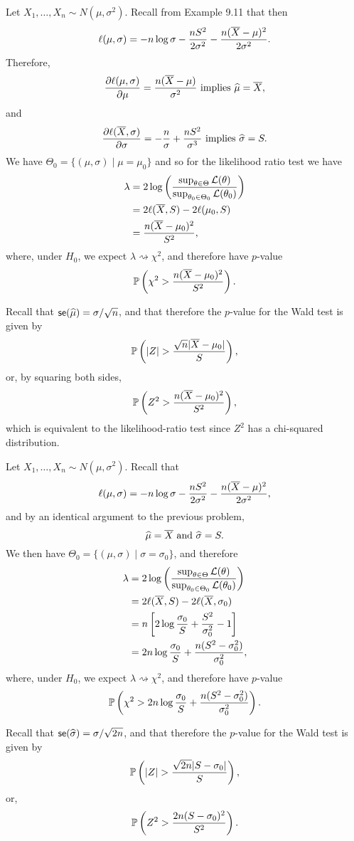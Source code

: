 \begin{ex}
  Let $X_1,\ldots, X_n\sim N(\mu, \sigma^2)$. Recall from Example 9.11 that then
  \[
    \ell(\mu, \sigma)
    =-n\log\sigma -\frac{nS^2}{2\sigma^2}-\frac{n(\Xbar-\mu)^2}{2\sigma^2}.
  \]
  Therefore,
  \[
    \frac{\pd \ell(\mu, \sigma)}{\pd \mu}
    =\frac{n(\Xbar-\mu)}{\sigma^2}
    \text{ implies }
    \muhat = \overline{X},
  \]
  and
  \[
    \frac{\pd \ell(\Xbar, \sigma)}{\pd \sigma}=-\frac{n}{\sigma}+\frac{nS^2}{\sigma^3}
    \text{ implies }
    \sigmahat = S.
  \]
  We have $\Theta_0=\{(\mu, \sigma) \mid \mu=\mu_0\}$ and so for the likelihood
  ratio test we have
  \begin{align*}
    \lambda
     & = 2\log\left(\frac{\sup_{\theta\in\Theta}\L(\theta)}{\sup_{\theta_0\in\Theta_0}\L(\theta_0)} \right) \\
     & =2\ell(\Xbar, S)-2\ell(\mu_0, S)                                                                     \\
     & =\frac{n(\Xbar-\mu_0)^2}{S^2},
  \end{align*}
  where, under $H_0$, we expect $\lambda\rightsquigarrow \chi^2$, and
  therefore have $p$-value
  \[
    \P{\chi^2>\frac{n(\Xbar-\mu_0)^2}{S^2}}.
  \]

  Recall that $\se(\muhat)=\sigma/\sqrt{n}$, and that therefore the $p$-value
  for the Wald test is given by
  \[
    \P{|Z|>\frac{\sqrt{n}|\Xbar -\mu_0|}{S}},
  \]
  or, by squaring both sides,
  \[
    \P{Z^2>\frac{n(\Xbar -\mu_0)^2}{S^2}},
  \]
  which is equivalent to the likelihood-ratio test since $Z^2$ has a chi-squared
  distribution.
\end{ex}

\begin{ex}
  Let $X_1,\ldots, X_n\sim N(\mu, \sigma^2)$. Recall that
  \[
    \ell(\mu, \sigma)=-n\log\sigma -\frac{nS^2}{2\sigma^2}-\frac{n(\Xbar-\mu)^2}{2\sigma^2},
  \]
  and by an identical argument to the previous problem,
  \[
    \muhat=\Xbar\text{ and }\sigmahat=S.
  \]
  We then have $\Theta_0=\{(\mu, \sigma) \mid \sigma=\sigma_0\}$, and therefore
  \begin{align*}
    \lambda
     & =2\log\left(\frac{\sup_{\theta\in\Theta}\L(\theta)}{\sup_{\theta_0\in\Theta_0}\L(\theta_0)} \right) \\
     & =2\ell(\Xbar, S)-2\ell(\Xbar, \sigma_0)                                                             \\
     & = n\left[2\log\frac{\sigma_0}{S}+\frac{S^2}{\sigma_0^2}-1\right]                                    \\
     & = 2n\log\frac{\sigma_0}{S}+\frac{n(S^2-\sigma_0^2)}{\sigma_0^2},
  \end{align*}
  where, under $H_0$, we expect $\lambda\rightsquigarrow \chi^2$, and
  therefore have $p$-value
  \[
    \P{\chi^2>
      2n\log\frac{\sigma_0}{S}+\frac{n(S^2-\sigma_0^2)}{\sigma_0^2}
    }.
  \]

  Recall that $\se(\sigmahat)=\sigma/\sqrt{2n}$, and that therefore the
  $p$-value for the Wald test is given by
  \[
    \P{|Z|>\frac{\sqrt{2n}|S -\sigma_0|}{S}},
  \]
  or,
  \[
    \P{Z^2>\frac{2n(S -\sigma_0)^2}{S^2}}.
  \]
\end{ex}

